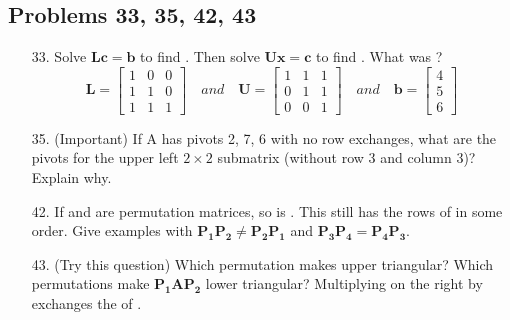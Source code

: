 \begin{itemize}
\begin{enumerate}
    \end{enumerate}

    \subsection{Problems 33, 35, 42, 43}\color{foreground-2}
    \begin{itemize}
      \item[33.] Solve \(\bm{Lc} = \bm{b}\) to find . Then solve \(\bm{Ux} =
        \bm{c}\) to find . What was ?
        \[%
        \bm{L} = \begin{bmatrix}
        1 & 0 & 0 \\
        1 & 1 & 0 \\
        1 & 1 & 1
        \end{bmatrix}\quad and \quad
        \bm{U} = \begin{bmatrix}
        1 & 1 & 1 \\
        0 & 1 & 1 \\
        0 & 0 & 1
        \end{bmatrix} \quad and \quad
        \bm{b} = \begin{bmatrix} 4 \\ 5 \\ 6 \end{bmatrix}
        \]%

      \item[35.] (Important) If A has pivots 2, 7, 6 with no row exchanges,
        what are the pivots for the upper left \(2 \times 2\) submatrix 
        (without row 3 and column 3)? Explain why.

      \item[42.] If  and  are permutation matrices, so is
        . This still has the rows of  in some order. Give
        examples with \(\bm{P_1P_2} \neq \bm{P_2P_1}\) and \(\bm{P_3P_4} =
          \bm{P_4P_3}\).

      \item[43.] (Try this question) Which permutation makes  upper
        triangular? Which permutations make \(\bm{P_1AP_2}\) lower triangular?
        Multiplying  on the right by  exchanges the 
        of .

    \end{itemize}

\end{itemize}

